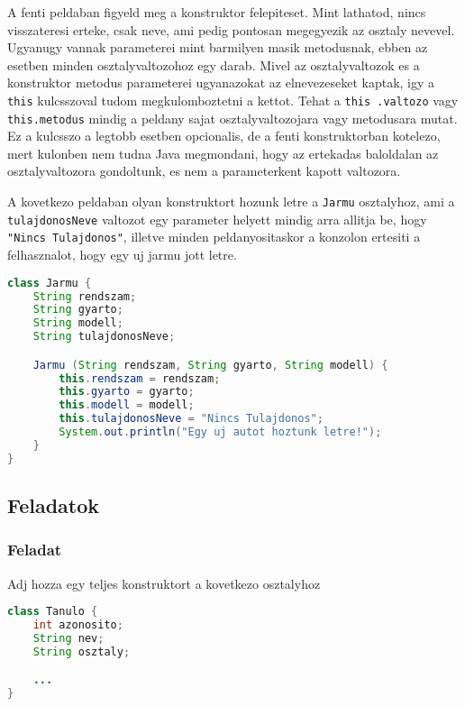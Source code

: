 \documentclass{article}
\let\l\lstinline
\begin{document}
A fenti peldaban figyeld meg a konstruktor felepiteset. Mint lathatod, nincs visszateresi erteke, csak neve, ami
pedig pontosan megegyezik az osztaly nevevel. Ugyanugy vannak parameterei mint barmilyen masik metodusnak, ebben az
esetben minden osztalyvaltozohoz egy darab. Mivel az osztalyvaltozok es a konstruktor metodus parameterei ugyanazokat
az elnevezeseket kaptak, igy a \l{this} kulcsszoval tudom megkulomboztetni a kettot. Tehat a \l{this
.valtozo} vagy \l{this.metodus} mindig a peldany sajat osztalyvaltozojara vagy metodusara mutat. Ez a
kulcsszo a legtobb esetben opcionalis, de a fenti konstruktorban kotelezo, mert kulonben nem tudna Java megmondani,
hogy az ertekadas baloldalan az osztalyvaltozora gondoltunk, es nem a parameterkent kapott valtozora.

A kovetkezo peldaban olyan konstruktort hozunk letre a \l{Jarmu} osztalyhoz, ami a \l{tulajdonosNeve}
valtozot egy parameter helyett mindig arra allitja be, hogy \l{"Nincs Tulajdonos"}, illetve minden
peldanyositaskor a konzolon ertesiti a felhasznalot, hogy egy uj jarmu jott letre.

\begin{lstlisting}[language=Java, caption=Konstruktor pelda]
class Jarmu {
    String rendszam;
    String gyarto;
    String modell;
    String tulajdonosNeve;

    Jarmu (String rendszam, String gyarto, String modell) {
        this.rendszam = rendszam;
        this.gyarto = gyarto;
        this.modell = modell;
        this.tulajdonosNeve = "Nincs Tulajdonos";
        System.out.println("Egy uj autot hoztunk letre!");
    }
}
\end{lstlisting}

\newpage

\subsection{Feladatok}

\subsubsection{Feladat}

Adj hozza egy teljes konstruktort a kovetkezo osztalyhoz

\begin{lstlisting}[language=Java, caption=Feladat]
class Tanulo {
    int azonosito;
    String nev;
    String osztaly;

    ...
}
\end{lstlisting}
\end{document}
